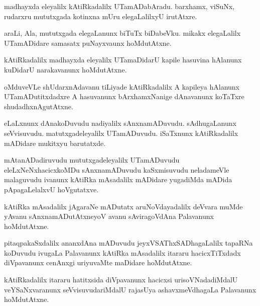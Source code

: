 \documentclass{article}
\begin{document}
\begin{mn}%
madhayxda eleyalilx kAtiRkadalilx UTamADabAradu. barxhamx, viSuNx, rudarxru mututxgada kotinxna 
mUru elegaLalilxyU irutAtxre.
\end{mn}

\begin{mn}%
araLi, Ala, mututxgada elegaLanunx biTuTx biDabeVku. mikakx elegaLalilx UTamADidare samasatx 
puNayxvaunx hoMdutAtxne.
\end{mn}

\begin{mn}%
kAtiRkadalilx madhayxda eleyalilx UTamaDidarU kapile hasuvina hAlanunx kuDidarU narakavanunx 
hoMdutAtxne.
\end{mn}

\begin{mn}%
oMduveVLe shUdarxnAdavanu tiLiyade kAtiRkadalilx A kapileya hAlanunx UTamADutitxdadxre A 
hasuvanunx bArxhamxNanige dAnavanunx koTaTxre shudadhxnAgutAtxne.
\end{mn}

\begin{mn}%
eLaLxnunx dAnakoDuvudu nadiyalilx sAnxnamADuvudu. sAdhugaLanunx seVvisuvudu. matutxgadeleyalilx 
UTamADuvudu. iSaTxnunx kAtiRkadalilx mADidare mukitxyu barutatxde.
\end{mn}

\begin{mn}%
mAtanADadiruvudu mututxgadeleyalilx  UTamADuvudu eleLxNeNxhacicxkoMDu sAnxnamADuvudu kaSxmisuvudu 
neladameVle malaguvudu ivanunx kAtiRka mAsadalilx mADidare yugadiMda mADida pApagaLelalxvU 
hoVgutatxve.
\end{mn}

\begin{mn}%
kAtiRka mAsadalilx jAgaraNe mADutatx aruNoVdayadalilx deVvara muMde yAvanu sAnxnamADutAtxneyoV 
avanu sAviragoVdAna Palavanunx hoMdutAtxne.
\end{mn}

\begin{mn}%
pitaqpakaSxdalilx ananxdAna mADuvudu jeyxVSAThxSADhagaLalilx tapaRNa koDuvudu ivugaLa Palavanunx 
kAtiRka mAsadalilx itararu hacicxTiTxdadx diVpavanunx cenAnxgi uriyuvaMte maDidare hoMdutAtxne.
\end{mn}

\begin{mn}%
kAtiRkadalilx itararu hatitxsida diVpavanunx hacicxsi urisoVNadadiMdalU veYSaNxvaranunx 
seVvisuvudariMdalU rajasUya ashavxmeVdhagaLa Palavanunx hoMdutAtxne.
\end{mn}
\end{document}
